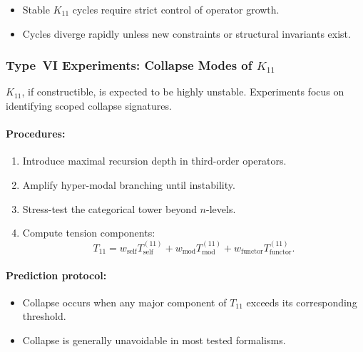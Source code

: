 \begin{itemize}
    \item Stable $K_{11}$ cycles require strict control of
          operator growth.
    \item Cycles diverge rapidly unless new constraints or
          structural invariants exist.
\end{itemize}



\subsubsection{Type~VI Experiments: Collapse Modes of $K_{11}$}

$K_{11}$, if constructible, is expected to be highly unstable.
Experiments focus on identifying scoped collapse signatures.

\paragraph{Procedures:}

\begin{enumerate}
    \item Introduce maximal recursion depth in third-order operators.
    \item Amplify hyper-modal branching until instability.
    \item Stress-test the categorical tower beyond $n$-levels.
    \item Compute tension components:
          \[
              T_{11} =
                w_{\mathrm{self}} T_{\mathrm{self}}^{(11)}
              + w_{\mathrm{mod}} T_{\mathrm{mod}}^{(11)}
              + w_{\mathrm{functor}} T_{\mathrm{functor}}^{(11)}.
          \]
\end{enumerate}

\paragraph{Prediction protocol:}

\begin{itemize}
    \item Collapse occurs when any major component of $T_{11}$ exceeds
          its corresponding threshold.
    \item Collapse is generally unavoidable in most tested formalisms.
\end{itemize}



